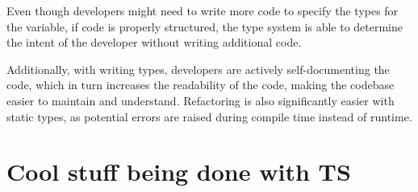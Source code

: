 Even though developers might need to write more code to specify the types for the variable, if code is properly structured, the type system is able to determine the intent of the developer without writing additional code.



Additionally, with writing types, developers are actively self-documenting the code, which in turn increases the readability of the code, making the codebase easier to maintain and understand. Refactoring is also significantly easier with static types, as potential errors are raised during compile time instead of runtime.


\section{Cool stuff being done with TS}
